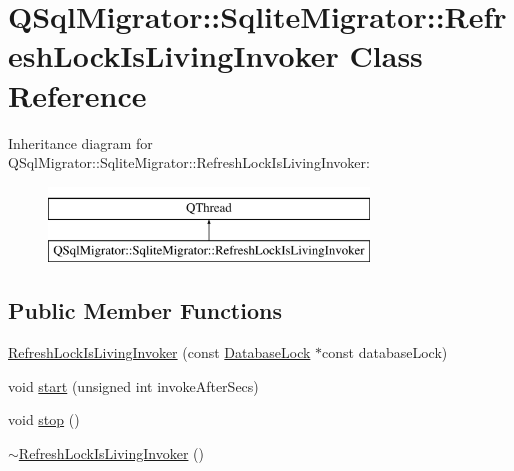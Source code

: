 \hypertarget{class_q_sql_migrator_1_1_sqlite_migrator_1_1_refresh_lock_is_living_invoker}{}\section{Q\+Sql\+Migrator\+:\+:Sqlite\+Migrator\+:\+:Refresh\+Lock\+Is\+Living\+Invoker Class Reference}
\label{class_q_sql_migrator_1_1_sqlite_migrator_1_1_refresh_lock_is_living_invoker}
Inheritance diagram for Q\+Sql\+Migrator\+:\+:Sqlite\+Migrator\+:\+:Refresh\+Lock\+Is\+Living\+Invoker\+:\begin{figure}[H]
\begin{center}
\leavevmode
\includegraphics[height=2.000000cm]{class_q_sql_migrator_1_1_sqlite_migrator_1_1_refresh_lock_is_living_invoker}
\end{center}
\end{figure}
\subsection*{Public Member Functions}
\begin{DoxyCompactItemize}
\item 
\hyperlink{class_q_sql_migrator_1_1_sqlite_migrator_1_1_refresh_lock_is_living_invoker_a906d849ff01d1a3de866b1226f153d07}{Refresh\+Lock\+Is\+Living\+Invoker} (const \hyperlink{class_q_sql_migrator_1_1_sqlite_migrator_1_1_database_lock}{Database\+Lock} $\ast$const database\+Lock)
\item 
void \hyperlink{class_q_sql_migrator_1_1_sqlite_migrator_1_1_refresh_lock_is_living_invoker_acac1953cd1b90584862d31d2f6ac3daa}{start} (unsigned int invoke\+After\+Secs)
\item 
void \hyperlink{class_q_sql_migrator_1_1_sqlite_migrator_1_1_refresh_lock_is_living_invoker_a11af357a94337f3ec1d39b34abb80ca4}{stop} ()
\item 
\hyperlink{class_q_sql_migrator_1_1_sqlite_migrator_1_1_refresh_lock_is_living_invoker_aff59c92cadb7175664d81b33c3644242}{$\sim$\+Refresh\+Lock\+Is\+Living\+Invoker} ()
\end{DoxyCompactItemize}


